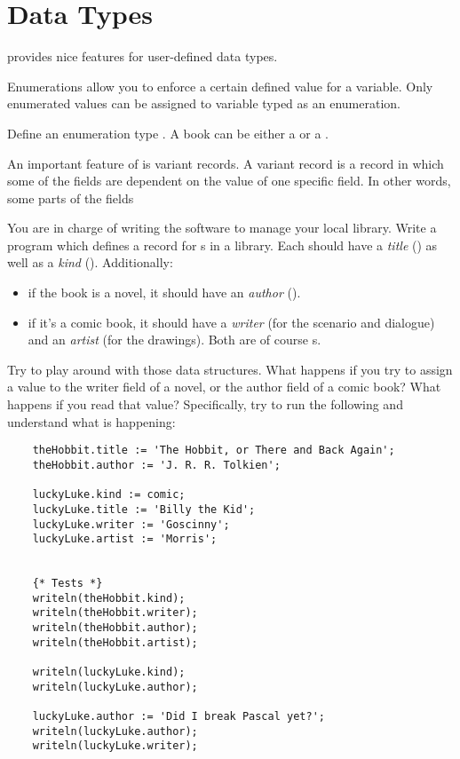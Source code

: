 \documentclass{../../tp}
\begin{document}
\section{Data Types}

\pascal provides nice features for user-defined data types. 

Enumerations allow you to enforce a certain defined value for a variable. Only enumerated values can be assigned to variable typed as an enumeration.

\begin{instruction}
	
Define an enumeration type . A book can be either a  or a .

\end{instruction}


An important feature of \pascal is variant records. A variant record is a record in which some of the fields are dependent on the value of one specific field. In other words, some parts of the fields 

\begin{instruction}
	You are in charge of writing the software to manage your local library. Write a program which defines a record for s in a library. Each  should have a \emph{title} () as well as a \emph{kind} (). Additionally: 
	\begin{itemize}
		\item if the book is a novel, it should have an \emph{author} ().
		\item if it's a comic book, it should have a \emph{writer} (for the scenario and dialogue) and an \emph{artist} (for the drawings). Both are of course s.
	\end{itemize} 
	
	Try to play around with those data structures. What happens if you try to assign a value to the writer field of a novel, or the author field of a comic book? What happens if you read that value?
	Specifically, try to run the following and understand what is happening:
	
	\begin{verbatim}
	theHobbit.title := 'The Hobbit, or There and Back Again';
	theHobbit.author := 'J. R. R. Tolkien';
	    
	luckyLuke.kind := comic;
	luckyLuke.title := 'Billy the Kid';
	luckyLuke.writer := 'Goscinny';
	luckyLuke.artist := 'Morris';
	    
	    
	{* Tests *}
	writeln(theHobbit.kind);
	writeln(theHobbit.writer);                                                                                    
	writeln(theHobbit.author);
	writeln(theHobbit.artist);
	    
	writeln(luckyLuke.kind);    
	writeln(luckyLuke.author);
	    
	luckyLuke.author := 'Did I break Pascal yet?';
	writeln(luckyLuke.author);
	writeln(luckyLuke.writer);
	\end{verbatim}
	
\end{instruction}

\subsection{}
\end{document}
